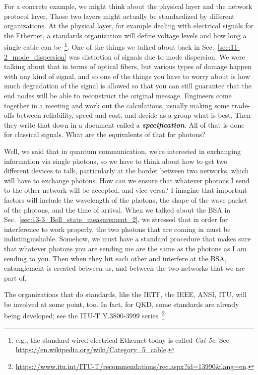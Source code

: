 For a concrete example, we might think about the physical layer and the network protocol layer. Those two layers might actually be standardized by different organizations. At the physical layer, for example dealing with electrical signals for the Ethernet, a standards organization will define voltage levels and how long a single cable can be~\footnote{e.g., the standard wired electrical Ethernet today is called \emph{Cat 5e}. See \url{https://en.wikipedia.org/wiki/Category_5_cable}.}. One of the things we talked about back in Sec.~\ref{sec:11-2_mode_dispersion} was distortion of signals due to mode dispersion. We were talking about that in terms of optical fibers, but various types of damage happen with any kind of signal, and so one of the things you have to worry about is how much degradation of the signal is allowed so that you can still guarantee that the end nodes will be able to reconstruct the original message. Engineers come together in a meeting and work out the calculations, usually making some trade-offs between reliability, speed and cost, and decide as a group what is best. Then they write that down in a document called a \textbf{\emph{specification}}. All of that is done for classical signals. What are the equivalents of that for photons?

\mmm Well, we said that in quantum communication, we're interested in exchanging information via single photons, so we have to think about how to get two different devices to talk, particularly at the border between two networks, which will have to exchange photons. How can we ensure that whatever photons I send to the other network will be accepted, and vice versa? I imagine that important factors will include the wavelength of the photons, the shape of the wave packet of the photons, and the time of arrival. When we talked about the BSA in Sec.~\ref{sec:13-3_Bell_state_measurement_2}, we stressed that in order for interference to work properly, the two photons that are coming in must be indistinguishable. Somehow, we must have a standard procedure that makes sure that whatever photons you are sending me are the same as the photons as I am sending to you. Then when they hit each other and interfere at the BSA, entanglement is created between us, and between the two networks that we are part of.

\rrr The organizations that do standards, like the IETF, the IEEE, ANSI, ITU, will be involved at some point, too. In fact, for QKD, some standards are already being developed; see the ITU-T Y.3800-3999 series~\footnote{\url{https://www.itu.int/ITU-T/recommendations/rec.aspx?id=13990&lang=en}.}

